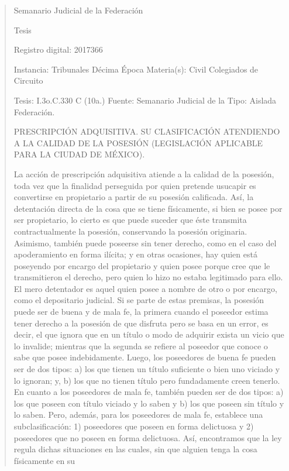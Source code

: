 \documentclass[11pt,a4paper]{article}
\begin{document}
\begin{quote}
                                                   Semanario Judicial de la Federación

                                               Tesis

 Registro digital: 2017366

 Instancia: Tribunales             Décima Época                          Materia(s): Civil
 Colegiados de Circuito

 Tesis: I.3o.C.330 C (10a.)        Fuente: Semanario Judicial de la      Tipo: Aislada
                                   Federación.


PRESCRIPCIÓN ADQUISITIVA. SU CLASIFICACIÓN ATENDIENDO A LA CALIDAD DE LA
POSESIÓN (LEGISLACIÓN APLICABLE PARA LA CIUDAD DE MÉXICO).


La acción de prescripción adquisitiva atiende a la calidad de la posesión, toda vez que la finalidad
perseguida por quien pretende usucapir es convertirse en propietario a partir de su posesión
calificada. Así, la detentación directa de la cosa que se tiene físicamente, si bien se posee por ser
propietario, lo cierto es que puede suceder que éste transmita contractualmente la posesión,
conservando la posesión originaria. Asimismo, también puede poseerse sin tener derecho, como en
el caso del apoderamiento en forma ilícita; y en otras ocasiones, hay quien está poseyendo por
encargo del propietario y quien posee porque cree que le transmitieron el derecho, pero quien lo
hizo no estaba legitimado para ello. El mero detentador es aquel quien posee a nombre de otro o
por encargo, como el depositario judicial. Si se parte de estas premisas, la posesión puede ser de
buena y de mala fe, la primera cuando el poseedor estima tener derecho a la posesión de que
disfruta pero se basa en un error, es decir, el que ignora que en un título o modo de adquirir exista
un vicio que lo invalide; mientras que la segunda se refiere al poseedor que conoce o sabe que
posee indebidamente. Luego, los poseedores de buena fe pueden ser de dos tipos: a) los que
tienen un título suficiente o bien uno viciado y lo ignoran; y, b) los que no tienen título pero
fundadamente creen tenerlo. En cuanto a los poseedores de mala fe, también pueden ser de dos
tipos: a) los que poseen con título viciado y lo saben y b) los que poseen sin título y lo saben. Pero,
además, para los poseedores de mala fe, establece una subclasificación: 1) poseedores que
poseen en forma delictuosa y 2) poseedores que no poseen en forma delictuosa. Así, encontramos
que la ley regula dichas situaciones en las cuales, sin que alguien tenga la cosa físicamente en su

\end{quote}
\end{document}
